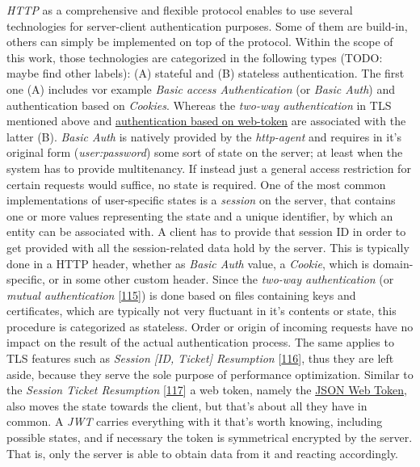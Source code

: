 \documentclass[12pt,english,a4paper,titlepage,cleardoublepage=empty,dottedtoc]{report}
\begin{document}
\emph{HTTP} as a comprehensive and flexible protocol enables to use
several technologies for server-client authentication purposes. Some of
them are build-in, others can simply be implemented on top of the
protocol. Within the scope of this work, those technologies are
categorized in the following types (TODO: maybe find other labels): (A)
stateful and (B) stateless authentication. The first one (A) includes
vor example \emph{Basic access Authentication} (or \emph{Basic Auth})
and authentication based on \emph{Cookies}. Whereas the \emph{two-way
authentication} in TLS mentioned above and
\protect\hyperlink{link_jwt}{authentication based on web-token} are
associated with the latter (B). \emph{Basic Auth} is natively provided
by the \emph{http-agent} and requires in it's original form
(\emph{user:password}) some sort of state on the server; at least when
the system has to provide multitenancy. If instead just a general access
restriction for certain requests would suffice, no state is required.
One of the most common implementations of user-specific states is a
\emph{session} on the server, that contains one or more values
representing the state and a unique identifier, by which an entity can
be associated with. A client has to provide that session ID in order to
get provided with all the session-related data hold by the server. This
is typically done in a HTTP header, whether as \emph{Basic Auth} value,
a \emph{Cookie}, which is domain-specific, or in some other custom
header. Since the \emph{two-way authentication} (or \emph{mutual
authentication}
{[}\protect\hyperlink{ref-web_2017_wikipedia_mutual-auth}{115}{]}) is
done based on files containing keys and certificates, which are
typically not very fluctuant in it's contents or state, this procedure
is categorized as stateless. Order or origin of incoming requests have
no impact on the result of the actual authentication process. The same
applies to TLS features such as \emph{Session {[}ID, Ticket{]}
Resumption}
{[}\protect\hyperlink{ref-book_2013_networking-101_tls-session-resumption}{116}{]},
thus they are left aside, because they serve the sole purpose of
performance optimization. Similar to the \emph{Session Ticket
Resumption}
{[}\protect\hyperlink{ref-web_spec_tls-session-ticket-resumption}{117}{]}
a web token, namely the \protect\hyperlink{link_jwt}{JSON Web Token},
also moves the state towards the client, but that's about all they have
in common. A \emph{JWT} carries everything with it that's worth knowing,
including possible states, and if necessary the token is symmetrical
encrypted by the server. That is, only the server is able to obtain data
from it and reacting accordingly.
\end{document}
